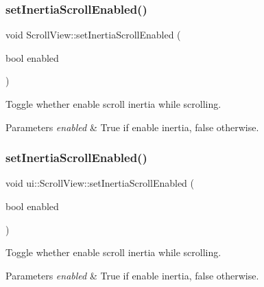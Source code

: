 \subsubsection{\texorpdfstring{set\+Inertia\+Scroll\+Enabled()}{setInertiaScrollEnabled()}\hspace{0.1cm}{\footnotesize\ttfamily [1/2]}}
{\footnotesize\ttfamily void Scroll\+View\+::set\+Inertia\+Scroll\+Enabled (\begin{DoxyParamCaption}\item[{bool}]{enabled }\end{DoxyParamCaption})}



Toggle whether enable scroll inertia while scrolling. 


\begin{DoxyParams}{Parameters}
{\em enabled} & True if enable inertia, false otherwise. \\
\hline
\end{DoxyParams}
\mbox{\label{classui_1_1ScrollView_a674460116c49a4be56a74ff8ac0bee2c}} 
\subsubsection{\texorpdfstring{set\+Inertia\+Scroll\+Enabled()}{setInertiaScrollEnabled()}\hspace{0.1cm}{\footnotesize\ttfamily [2/2]}}
{\footnotesize\ttfamily void ui\+::\+Scroll\+View\+::set\+Inertia\+Scroll\+Enabled (\begin{DoxyParamCaption}\item[{bool}]{enabled }\end{DoxyParamCaption})}



Toggle whether enable scroll inertia while scrolling. 


\begin{DoxyParams}{Parameters}
{\em enabled} & True if enable inertia, false otherwise. \\
\hline
\end{DoxyParams}
\mbox{\label{classui_1_1ScrollView_a137ec6b7e449bebbb80e784965f6a859}} 
